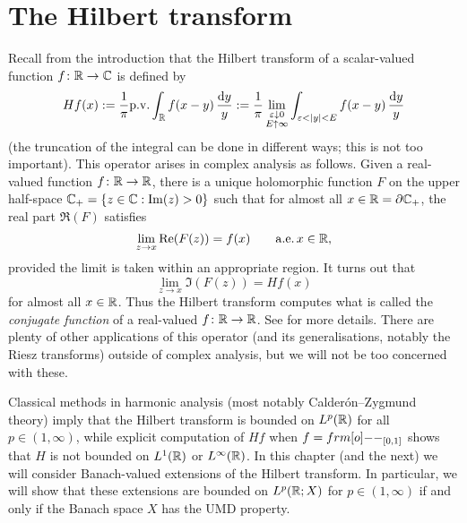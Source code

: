 \section{The Hilbert transform}

Recall from the introduction that the Hilbert transform of a scalar-valued function $f \colon \mathbb{R} \rightarrow \mathbb{C}$ is defined by
\begin{equation*}
  Hf(x) := \frac{1}{\pi} \mathrm{p. v.} \int_{\mathbb{R}} f(x-y) \, \frac{\mathrm{d} y}{y} := \frac{1}{\pi} \lim_{\substack{\varepsilon \downarrow 0 \\ E \uparrow \infty}} \int_{\varepsilon < |y| < E} f(x-y) \, \frac{\mathrm{d} y}{y}
\end{equation*}
(the truncation of the integral can be done in different ways; this is not too important).
This operator arises in complex analysis as follows.
Given a real-valued function $f \colon \mathbb{R} \rightarrow \mathbb{R}$, there is a unique holomorphic function $F$ on the upper half-space $\mathbb{C}_{+} = \{z \in \mathbb{C} : \mathrm{Im}(z) > 0\}$ such that for almost all $x \in \mathbb{R} = \partial \mathbb{C}_{+}$, the real part $\Re(F)$ satisfies
\begin{equation*}
  \lim_{z \to x} \mathrm{Re}(F(z)) = f(x) \qquad \mathrm{a.e.} \,  x \in \mathbb{R},
\end{equation*}
provided the limit is taken within an appropriate region.
It turns out that
\begin{equation*}
  \lim_{z \to x} \Im(F(z)) = Hf(x)
\end{equation*}
for almost all $x \in \mathbb{R}$.
Thus the Hilbert transform computes what is called the \emph{conjugate function} of a real-valued $f \colon \mathbb{R} \rightarrow \mathbb{R}$.
See \cite[.2]{grafakos} for more details.
There are plenty of other applications of this operator (and its generalisations, notably the Riesz transforms) outside of complex analysis, but we will not be too concerned with these.

Classical methods in harmonic analysis (most notably Calder\'on--Zygmund theory) imply that the Hilbert transform is bounded on $L^p(\mathbb{R})$ for all $p \in (1,\infty)$, while explicit computation of $Hf$ when $f = \1_{[0,1]}$ shows that $H$ is not bounded on $L^1(\mathbb{R})$ or $L^\infty(\mathbb{R})$.
In this chapter (and the next) we will consider Banach-valued extensions of the Hilbert transform.
In particular, we will show that these extensions are bounded on $L^p(\mathbb{R};X)$ for $p \in (1,\infty)$ if and only if the Banach space $X$ has the UMD property.

